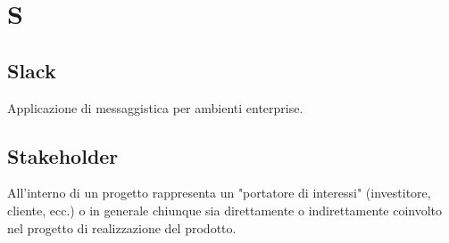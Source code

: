 \section{S}


\subsection{Slack}
Applicazione di messaggistica per ambienti enterprise.

\subsection{Stakeholder}
All’interno di un progetto rappresenta un "portatore di interessi" (investitore, cliente, ecc.) o in generale chiunque sia direttamente o indirettamente coinvolto nel progetto di realizzazione del prodotto.

\clearpage